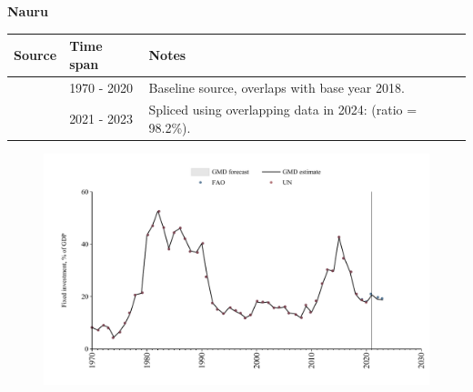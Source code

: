 \documentclass[12pt,a4paper,landscape]{article}
\begin{document}
\begin{adjustbox}{max totalsize={\paperwidth}{\paperheight},center}
\begin{minipage}[t][\textheight][t]{\textwidth}
\vspace*{0.5cm}
{}
\begin{center}
{\Large\bfseries Nauru}
\end{center}
\vspace{0.5cm}
\begin{table}[H]
\centering
\small
\begin{tabular}{|l|l|l|}
\hline
\textbf{Source} & \textbf{Time span} & \textbf{Notes} \\
\hline
\rowcolor{white}\cite{UN}& 1970 - 2020 &Baseline source, overlaps with base year 2018.\\
\rowcolor{lightgray}\cite{FAO}& 2021 - 2023 &Spliced using overlapping data in 2024: (ratio = 98.2\%).\\
\hline
\end{tabular}
\end{table}
\begin{figure}[H]
\centering
\includegraphics[width=\textwidth,height=0.6\textheight,keepaspectratio]{graphs/NRU_finv_GDP.pdf}
\end{figure}
\end{minipage}
\end{adjustbox}
\end{document}
